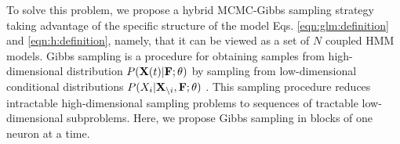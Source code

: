 %
%

To solve this problem, we propose a hybrid MCMC-Gibbs sampling strategy taking advantage of the specific structure of the model Eqs. \eqref{eqn:glm:definition} and \eqref{eqn:h:definition}, namely, that it can be viewed as a set of $N$ coupled HMM models. Gibbs sampling is a procedure for obtaining samples from high-dimensional distribution $P({\bf X}(t) | {\bf F}; \mathbf{\theta})$ by sampling from low-dimensional conditional distributions $P(X_{i}|{\bf X}_{\backslash i}, {\bf F}; \mathbf{\theta})$  \cite{Gelfand1990}.  This sampling procedure reduces intractable high-dimensional sampling problems to sequences of tractable low-dimensional subproblems.  Here, we propose Gibbs sampling in blocks of one neuron at a time.  
%

